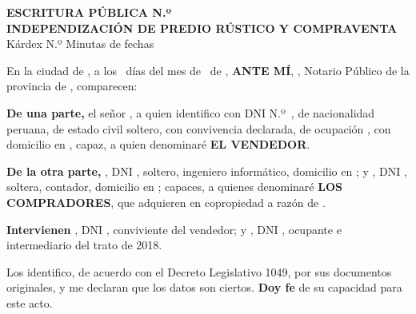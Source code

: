 \documentclass[12pt,a4paper]{article}
\begin{document}



\vspace{0.45em}
\begin{center}
{\large\bfseries\color{tinta}ESCRITURA PÚBLICA N.º \linea[2.6cm]}\\[0.15em]
{\bfseries INDEPENDIZACIÓN DE PREDIO RÚSTICO Y COMPRAVENTA}\\[0.1em]
{\small Kárdex N.º \linea[2.2cm] \quad Minutas de fechas \linea[3.8cm]}
\end{center}

\vspace{0.25em}
\noindent En la ciudad de \NotariaCiudad, a los \DiaOtorgamiento\ días del mes de \MesOtorgamiento\ de \AnioOtorgamiento, \textbf{ANTE MÍ}, \NotarioNombre, Notario Público de la provincia de \Provincia, comparecen:

\vspace{0.3em}
\noindent \textbf{De una parte,} el señor \textbf{\VendedorNombreCompleto}, a quien identifico con DNI N.º\ \VendedorDNI, de nacionalidad peruana, de estado civil soltero, con convivencia declarada, de ocupación \VendedorOcupacion, con domicilio en \VendedorDomicilio, capaz, a quien denominaré \textbf{EL VENDEDOR}.

\vspace{0.2em}
\noindent \textbf{De la otra parte,} \textbf{\CompradorUnoNombre}, DNI \CompradorUnoDNI, soltero, ingeniero informático, domicilio en \CompradorUnoDomicilio; y \textbf{\CompradorDosNombre}, DNI \CompradorDosDNI, soltera, contador, domicilio en \CompradorDosDomicilio; capaces, a quienes denominaré \textbf{LOS COMPRADORES}, que adquieren en copropiedad a razón de \PorcentajeCopropiedad.

\vspace{0.2em}
\noindent \textbf{Intervienen} \ConvivienteNombre, DNI \ConvivienteDNI, conviviente del vendedor; y \IntermediarioNombre, DNI \IntermediarioDNI, ocupante e intermediario del trato de 2018.

\vspace{0.2em}
\noindent Los identifico, de acuerdo con el Decreto Legislativo 1049, por sus documentos originales, y me declaran que los datos son ciertos. \textbf{Doy fe} de su capacidad para este acto.
\end{document}
